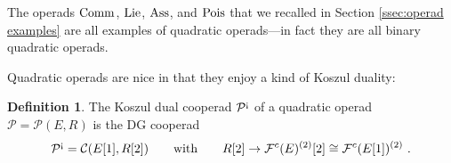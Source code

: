 \documentclass[11pt]{amsart}
\numberwithin{equation}{section}
\theoremstyle{definition}
\newtheorem{defn}[theo]{Definition}
\newcommand{\bb}{\mathbb}
\newcommand{\mc}{\mathcal}
\newcommand{\mf}{\mathfrak}
\newcommand{\Mod}{{\textup{-Mod}}}
\newcommand{\Pois}{{\textup{Pois}}}
\newcommand{\Comm}{{\textup{Comm}}}
\newcommand{\Lie}{{\textup{Lie}}}
\newcommand{\ash}{{\textup{\mbox{!`}}}}
\newcommand{\Ass}{{\textup{Ass}}}
\newcommand{\Ss}{{{\mf{S}}}}
\newcommand{\0}{{\textbf{0}}}
\newcommand{\id}{{\textup{id}}}
\newcommand{\Z}{\bb Z}
\def\PP{{\mc P}}
\def \mf{\mathfrak}
\def \id{\mathbbm{1}}
\begin{document}
%
%
%

The operads $\Comm$, $\Lie$, $\Ass$, and $\Pois$ that we recalled in Section \ref{ssec:operad examples} are all examples of quadratic operads---in fact they are all binary quadratic operads.

Quadratic operads are nice in that they enjoy a kind of Koszul duality:

\begin{defn} 

The Koszul dual cooperad $\mc P^\ash$ of a quadratic operad $\mc P=\mc P(E,R)$ is the DG cooperad
\[ 
\mc P^\ash= \mc C(E[1],R[2]) \qquad \text{with} \qquad R[2] \to \mc F^c(E)^{(2)}[2] \cong \mc F^c(E[1])^{(2)}  ~.
\]

\end{defn}





\end{document}
